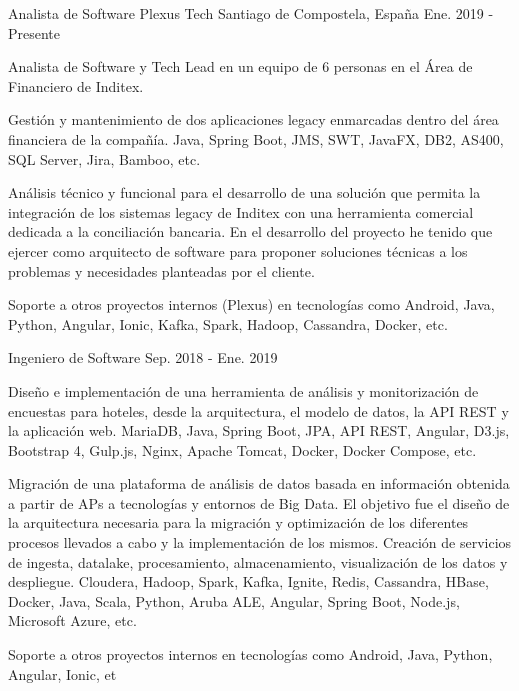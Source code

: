 
\begin{cventries}
  \cventry
    {Analista de Software}
    {Plexus Tech}
    {Santiago de Compostela, España}
    {Ene. 2019 - Presente}
    {
      \begin{cvitems}
        \item {Analista de Software y Tech Lead en un equipo de 6 personas en el Área de Financiero de Inditex.}
        \item {Gestión y mantenimiento de dos aplicaciones legacy enmarcadas dentro del área financiera de la compañía. Java, Spring Boot, JMS, SWT, JavaFX, DB2, AS400, SQL Server, Jira, Bamboo, etc.}
        \item {Análisis técnico y funcional para el desarrollo de una solución que permita la integración de los sistemas legacy de Inditex con una herramienta comercial dedicada a la conciliación bancaria. En el desarrollo del proyecto he tenido que ejercer como arquitecto de software para proponer soluciones técnicas a los problemas y necesidades planteadas por el cliente.}
        \item {Soporte a otros proyectos internos (Plexus) en tecnologías como Android, Java, Python, Angular, Ionic, Kafka, Spark, Hadoop, Cassandra, Docker, etc.}
      \end{cvitems}
    }

  \cventry
    {Ingeniero de Software}
    {}
    {}
    {Sep. 2018 - Ene. 2019}
    {
      \begin{cvitems}
        \item {Diseño e implementación de una herramienta de análisis y monitorización de encuestas para hoteles, desde la arquitectura, el modelo de datos, la API REST y la aplicación web. MariaDB, Java, Spring Boot, JPA, API REST, Angular, D3.js, Bootstrap 4, Gulp.js, Nginx, Apache Tomcat, Docker, Docker Compose, etc.}
        \item {Migración de una plataforma de análisis de datos basada en información obtenida a partir de APs a tecnologías y entornos de Big Data. El objetivo fue el diseño de la arquitectura necesaria para la migración y optimización de los diferentes procesos llevados a cabo y la implementación de los mismos. Creación de servicios de ingesta, datalake, procesamiento, almacenamiento, visualización de los datos y despliegue. Cloudera, Hadoop, Spark, Kafka, Ignite, Redis, Cassandra, HBase, Docker, Java, Scala, Python, Aruba ALE, Angular, Spring Boot, Node.js, Microsoft Azure, etc.}
        \item {Soporte a otros proyectos internos en tecnologías como Android, Java, Python, Angular, Ionic, et}
      \end{cvitems}
    }


\end{cventries}
